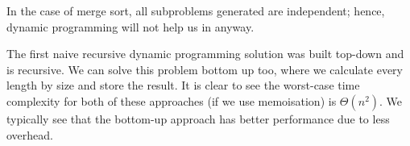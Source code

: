\begin{example}
    In the case of merge sort, all subproblems generated are independent; 
    hence, dynamic programming will not help us in anyway.
\end{example}

The first naive recursive dynamic programming solution was built top-down and is recursive. 
We can solve this problem bottom up too, 
where we calculate every length by size and store the result. 
It is clear to see the worst-case time complexity for both of these approaches 
(if we use memoisation) 
is $\Theta(n^2)$. 
We typically see that the bottom-up approach has better performance due to less overhead.
